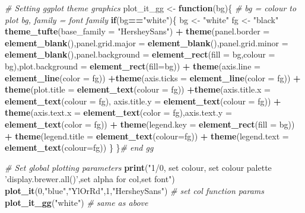 \documentclass[10,portrait]{article}
\newenvironment{Shaded}{\begin{snugshade}}{\end{snugshade}}
\newcommand{\KeywordTok}[1]{\textcolor[rgb]{0.13,0.29,0.53}{\textbf{#1}}}
\newcommand{\DataTypeTok}[1]{\textcolor[rgb]{0.13,0.29,0.53}{#1}}
\newcommand{\DecValTok}[1]{\textcolor[rgb]{0.00,0.00,0.81}{#1}}
\newcommand{\StringTok}[1]{\textcolor[rgb]{0.31,0.60,0.02}{#1}}
\newcommand{\CommentTok}[1]{\textcolor[rgb]{0.56,0.35,0.01}{\textit{#1}}}
\newcommand{\ControlFlowTok}[1]{\textcolor[rgb]{0.13,0.29,0.53}{\textbf{#1}}}
\newcommand{\OperatorTok}[1]{\textcolor[rgb]{0.81,0.36,0.00}{\textbf{#1}}}
\newcommand{\NormalTok}[1]{#1}
\begin{document}
\begin{Shaded}
\begin{Highlighting}[]
\CommentTok{# Setting ggplot theme graphics}
\NormalTok{plot_it_gg <-}\StringTok{ }\ControlFlowTok{function}\NormalTok{(bg)\{ }\CommentTok{# bg = colour to plot bg, family = font family}
  \ControlFlowTok{if}\NormalTok{(bg}\OperatorTok{==}\StringTok{"white"}\NormalTok{)\{}
\NormalTok{    bg <-}\StringTok{ "white"}
\NormalTok{    fg <-}\StringTok{ "black"}
  \KeywordTok{theme_tufte}\NormalTok{(}\DataTypeTok{base_family =} \StringTok{"HersheySans"}\NormalTok{) }\OperatorTok{+}
\StringTok{    }\KeywordTok{theme}\NormalTok{(}\DataTypeTok{panel.border =} \KeywordTok{element_blank}\NormalTok{(),}\DataTypeTok{panel.grid.major =} \KeywordTok{element_blank}\NormalTok{(),}\DataTypeTok{panel.grid.minor =} \KeywordTok{element_blank}\NormalTok{(),}\DataTypeTok{panel.background =} \KeywordTok{element_rect}\NormalTok{(}\DataTypeTok{fill =}\NormalTok{ bg,}\DataTypeTok{colour =}\NormalTok{ bg),}\DataTypeTok{plot.background =} \KeywordTok{element_rect}\NormalTok{(}\DataTypeTok{fill=}\NormalTok{bg)) }\OperatorTok{+}
\StringTok{    }\KeywordTok{theme}\NormalTok{(}\DataTypeTok{axis.line =} \KeywordTok{element_line}\NormalTok{(}\DataTypeTok{color =}\NormalTok{ fg)) }\OperatorTok{+}\KeywordTok{theme}\NormalTok{(}\DataTypeTok{axis.ticks =} \KeywordTok{element_line}\NormalTok{(}\DataTypeTok{color =}\NormalTok{ fg)) }\OperatorTok{+}\StringTok{ }\KeywordTok{theme}\NormalTok{(}\DataTypeTok{plot.title =} \KeywordTok{element_text}\NormalTok{(}\DataTypeTok{colour =}\NormalTok{ fg)) }\OperatorTok{+}\KeywordTok{theme}\NormalTok{(}\DataTypeTok{axis.title.x =} \KeywordTok{element_text}\NormalTok{(}\DataTypeTok{colour =}\NormalTok{ fg), }\DataTypeTok{axis.title.y =} \KeywordTok{element_text}\NormalTok{(}\DataTypeTok{colour =}\NormalTok{ fg)) }\OperatorTok{+}\StringTok{ }\KeywordTok{theme}\NormalTok{(}\DataTypeTok{axis.text.x =} \KeywordTok{element_text}\NormalTok{(}\DataTypeTok{color =}\NormalTok{ fg),}\DataTypeTok{axis.text.y =} \KeywordTok{element_text}\NormalTok{(}\DataTypeTok{color =}\NormalTok{ fg)) }\OperatorTok{+}\StringTok{ }\KeywordTok{theme}\NormalTok{(}\DataTypeTok{legend.key =} \KeywordTok{element_rect}\NormalTok{(}\DataTypeTok{fill =}\NormalTok{ bg)) }\OperatorTok{+}\StringTok{ }\KeywordTok{theme}\NormalTok{(}\DataTypeTok{legend.title =} \KeywordTok{element_text}\NormalTok{(}\DataTypeTok{colour=}\NormalTok{fg)) }\OperatorTok{+}\StringTok{ }\KeywordTok{theme}\NormalTok{(}\DataTypeTok{legend.text =} \KeywordTok{element_text}\NormalTok{(}\DataTypeTok{colour=}\NormalTok{fg))}
\NormalTok{\}}
\NormalTok{  \}}\CommentTok{# end gg}

\CommentTok{# Set global plotting parameters}
\KeywordTok{print}\NormalTok{(}\StringTok{"1/0, set colour, set colour palette 'display.brewer.all()',set alpha for col,set font"}\NormalTok{)}
\KeywordTok{plot_it}\NormalTok{(}\DecValTok{0}\NormalTok{,}\StringTok{"blue"}\NormalTok{,}\StringTok{"YlOrRd"}\NormalTok{,}\DecValTok{1}\NormalTok{,}\StringTok{"HersheySans"}\NormalTok{) }\CommentTok{# set col function params}
\KeywordTok{plot_it_gg}\NormalTok{(}\StringTok{"white"}\NormalTok{) }\CommentTok{# same as above}
\end{Highlighting}
\end{Shaded}
\end{document}
